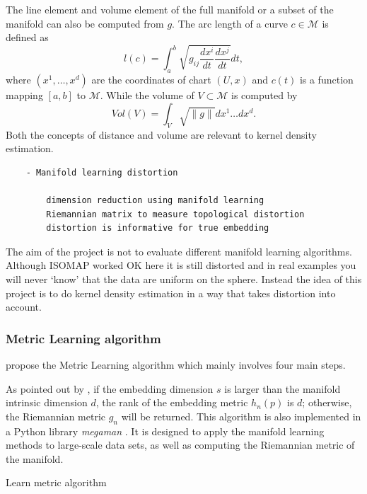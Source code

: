 \documentclass[11pt,a4paper,]{article}
\begin{document}
The line element and volume element of the full manifold or a subset of the manifold can also be computed from \(g\). The arc length of a curve \(c\in \mathcal{M}\) is defined as
\[
l(c)=\int_a^b \sqrt{g_{ij} \frac{dx^i}{dt} \frac{dx^j}{dt}} dt,
\]
where \((x^1,\dots,x^d)\) are the coordinates of chart \((U,x)\) and \(c(t)\) is a function mapping \([a,b]\) to \(\mathcal{M}\). While the volume of \(V\subset \mathcal{M}\) is computed by
\[
Vol(V)=\int_V \sqrt{\|g\|} dx^1\dots dx^d.
\]
Both the concepts of distance and volume are relevant to kernel density estimation.

\begin{verbatim}
    - Manifold learning distortion

        dimension reduction using manifold learning
        Riemannian matrix to measure topological distortion
        distortion is informative for true embedding
\end{verbatim}

The aim of the project is not to evaluate different manifold learning algorithms. Although ISOMAP worked OK here it is still distorted and in real examples you will never `know' that the data are uniform on the sphere. Instead the idea of this project is to do kernel density estimation in a way that takes distortion into account.

\hypertarget{metric-learning-algorithm}{%
\subsubsection{Metric Learning algorithm}\label{metric-learning-algorithm}}

\textcite{Perrault-Joncas2013-pq} propose the Metric Learning algorithm which mainly involves four main steps.

As pointed out by \textcite{Perrault-Joncas2013-pq}, if the embedding dimension \(s\) is larger than the manifold intrinsic dimension \(d\), the rank of the embedding metric \(h_n(p)\) is \(d\); otherwise, the Riemannian metric \(g_n\) will be returned.
This algorithm is also implemented in a Python library \emph{megaman} \autocite{McQueen2016-xz}. It is designed to apply the manifold learning methods to large-scale data sets, as well as computing the Riemannian metric of the manifold.

Learn metric algorithm
\end{document}
